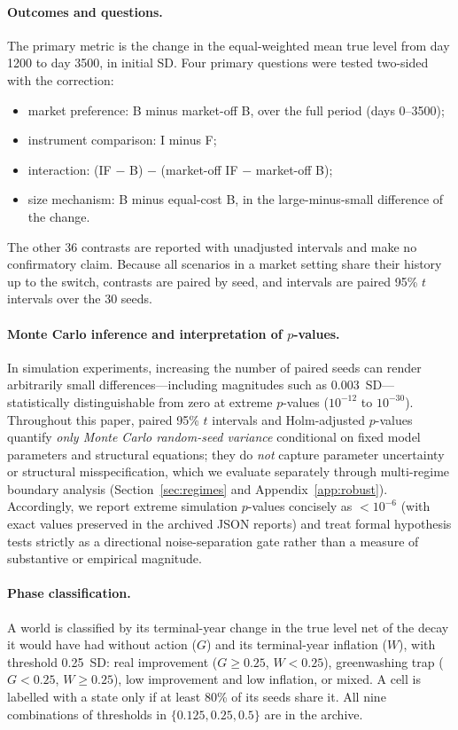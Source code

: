 \documentclass[11pt]{article}
\begin{document}
\paragraph{Outcomes and questions.} The primary metric is the change in the equal-weighted mean true level from day 1200 to day 3500, in initial SD. Four primary questions were tested two-sided with the \citet{holm1979simple} correction:
\begin{itemize}[leftmargin=*]
\item[P1] market preference: B minus market-off B, over the full period (days 0--3500);
\item[P2] instrument comparison: I minus F;
\item[P3] interaction: (IF $-$ B) $-$ (market-off IF $-$ market-off B);
\item[P4] size mechanism: B minus equal-cost B, in the large-minus-small difference of the change.
\end{itemize}
The other 36 contrasts are reported with unadjusted intervals and make no confirmatory claim. Because all scenarios in a market setting share their history up to the switch, contrasts are paired by seed, and intervals are paired 95\% $t$ intervals over the 30 seeds.

\paragraph{Monte Carlo inference and interpretation of $p$-values.}
In simulation experiments, increasing the number of paired seeds can render arbitrarily small differences---including magnitudes such as $0.003$~SD---statistically distinguishable from zero at extreme $p$-values ($10^{-12}$ to $10^{-30}$). Throughout this paper, paired 95\% $t$ intervals and Holm-adjusted $p$-values quantify \emph{only Monte Carlo random-seed variance} conditional on fixed model parameters and structural equations; they do \emph{not} capture parameter uncertainty or structural misspecification, which we evaluate separately through multi-regime boundary analysis (Section~\ref{sec:regimes} and Appendix~\ref{app:robust}). Accordingly, we report extreme simulation $p$-values concisely as $< 10^{-6}$ (with exact values preserved in the archived JSON reports) and treat formal hypothesis tests strictly as a directional noise-separation gate rather than a measure of substantive or empirical magnitude.

\paragraph{Phase classification.} A world is classified by its terminal-year change in the true level net of the decay it would have had without action ($G$) and its terminal-year inflation ($W$), with threshold 0.25~SD: real improvement ($G \ge 0.25$, $W < 0.25$), greenwashing trap ($G < 0.25$, $W \ge 0.25$), low improvement and low inflation, or mixed. A cell is labelled with a state only if at least 80\% of its seeds share it. All nine combinations of thresholds in $\{0.125, 0.25, 0.5\}$ are in the archive.
\end{document}

